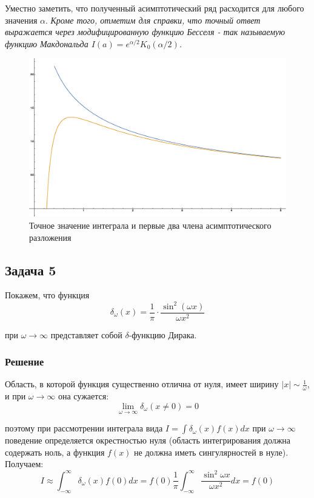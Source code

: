 \documentclass[a4paper,12pt]{article}
\begin{document}
\noindent
Уместно заметить, что полученный асимптотический ряд расходится для любого значения $\alpha$.
\textit{Кроме того, отметим для справки, что точный ответ
выражается через модифицированную функцию Бесселя - так называемую
функцию Макдональда $I(a)=e^{\alpha/2}K_{0}(\alpha/2)$.}

\begin{figure}[h]
\caption{Точное значение интеграла и первые два члена асимптотического разложения}
\centering
\includegraphics[width=0.65\columnwidth]{besselk.eps}
\end{figure}





\subsection*{Задача 5}

Покажем, что функция 
\[
\delta_{\omega}(x)=\frac{1}{\pi}\cdot\frac{\sin^{2}(\omega x)}{\omega x^{2}}
\]

\noindent
при $\omega\to\infty$ представляет собой $\delta$-функцию Дирака.


\subsubsection*{Решение}

Область, в которой функция существенно отлична от нуля, имеет ширину
$\left|x\right|\sim\frac{1}{\omega}$, и при $\omega\to\infty$ она
сужается:
\[
\lim_{\omega\to\infty}\delta_{\omega}(x\neq0)=0
\]

\noindent
поэтому при рассмотрении интеграла вида $I=\int\delta_{\omega}(x)f(x)dx$
при $\omega\to\infty$ поведение определяется окрестностью нуля (область
интегрирования должна содержать ноль, а функция $f\left(x\right)$
не должна иметь сингулярностей в нуле). Получаем:
\[
I\approx\int_{-\infty}^{\infty}\delta_{\omega}(x)f(0)dx=f(0)\frac{1}{\pi}\int_{-\infty}^{\infty}\frac{\sin^{2}\omega x}{\omega x^{2}}dx=f(0)
\]
\end{document}

